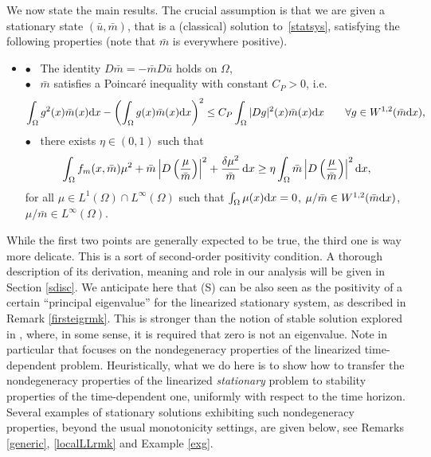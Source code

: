 \documentclass[10pt,a4paper,nouppercase,nowrite]{article}
\numberwithin{equation}{section}
\newcommand{\di}{{\rm d}}
\newcommand{\Sp}{{\textsc (S)} }
\theoremstyle{definition}
\begin{document}
	
	We now state the main results. The crucial assumption is that we are given a stationary state  $(\bar u, \bar m)$, that is a (classical) solution to~\eqref{statsys}, satisfying the following properties (note that $\bar m$ is everywhere positive).
	\begin{itemize}
		\item [\Sp]  
		$\bullet$ \, The identity $D\bar m = -\bar m D\bar u $ holds on $\Omega$, \\
		$\bullet$ \,  $\bar m$ satisfies a Poincar\'e inequality with constant $C_P > 0$, i.e.
		\[
		\int_{\Omega} g^2(x) \bar m(x) \di x - \left(\int_{\Omega} g(x) \bar m(x) \di x \right)^2 \le C_P \int_{\Omega} |Dg|^2(x) \bar m(x) \di x \qquad \forall g \in W^{1,2}(\bar m \di x),
		\]
		$\bullet$ \, there exists $\eta \in (0,1)$ such that 
		\begin{equation}
			\int_{\Omega} f_m(x,\bar{m}) \mu^2 + \bar m\left| D \left( \frac{\mu}{\bar{m}} \right) \right|^2 + \frac{\delta \mu^2}{\bar{m}} \, \di x \geq \eta \int_{\Omega} \bar m\left| D \left( \frac{\mu}{\bar{m}} \right) \right|^2 \di x,
			\label{T3}
		\end{equation}
		for all $\mu \in L^1(\Omega) \cap L^\infty(\Omega)$ such that $\int_{\Omega} \mu(x) \di x = 0$, $\mu/\bar m \in  W^{1,2}(\bar m \di x)$, $\mu/\bar m \in L^\infty(\Omega)$. 
	\end{itemize}
	While the first two points are generally expected to be true, the third one is way more delicate. This is a sort of second-order positivity condition. A thorough description of its derivation, meaning and role in our analysis will be given in Section \ref{sdisc}. We anticipate here that \Sp can be also seen as the positivity of a certain ``principal eigenvalue'' for the linearized stationary system, as described in Remark \ref{firsteigrmk}. This is stronger than the notion of stable solution explored in \cite{BLS25, BriCar17}, where, in some sense, it is required that zero is not an eigenvalue. Note in particular that \cite{BriCar17} focuses on the nondegeneracy properties of the linearized time-dependent problem. Heuristically, what we do here is to show how to transfer the nondegeneracy properties of the linearized \textit{stationary} problem to stability properties of the time-dependent one, uniformly with respect to the time horizon. Several examples of stationary solutions exhibiting such nondegeneracy properties, beyond the usual monotonicity settings, are given below, see Remarks \ref{generic}, \ref{localLLrmk} and Example \ref{exg}.
	
\end{document}
